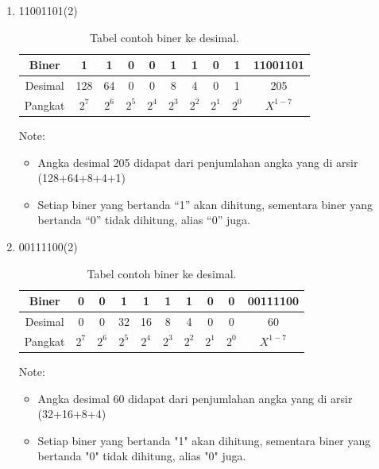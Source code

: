 \documentclass{article}
\begin{document}
\begin{enumerate}
\item 11001101(2) 

\begin{table}[h!]
\centering
\begin{tabular}{ |c|c|c|c|c|c|c|c|c|c| } 
\hline
Biner & 1 & 1 & 0 & 0 & 1 & 1 & 0 & 1 & 11001101 \\ 
\hline
Desimal & 128 & 64 & 0 & 0 & 8 & 4 & 0 & 1 & 205 \\ 
\hline
Pangkat & $2^7$ & $2^6$ & $2^5$ & $2^4$ & $2^3$ & $2^2$ & $2^1$ & $2^0$ & $X^{1-7}$ \\ 
\hline
\end{tabular}
\caption{Tabel contoh biner ke desimal.}
\label{table:contoh2}
\end{table}

Note:

\begin{itemize}
\item Angka desimal 205 didapat dari penjumlahan angka yang di arsir (128+64+8+4+1)
\item Setiap biner yang bertanda “1” akan dihitung, sementara biner yang bertanda “0” tidak dihitung, alias “0” juga.
\end{itemize}

\item 00111100(2) 

\begin{table}[h!]
\centering
\begin{tabular}{ |c|c|c|c|c|c|c|c|c|c| } 
\hline
Biner & 0 & 0 & 1 & 1 & 1 & 1 & 0 & 0 & 00111100 \\ 
\hline
Desimal & 0 & 0 & 32 & 16 & 8 & 4 & 0 & 0 & 60 \\ 
\hline
Pangkat & $2^7$ & $2^6$ & $2^5$ & $2^4$ & $2^3$ & $2^2$ & $2^1$ & $2^0$ & $X^{1-7}$ \\ 
\hline
\end{tabular}
\caption{Tabel contoh biner ke desimal.}
\label{table:contoh2}
\end{table}

Note:
\begin{itemize}
\item Angka desimal 60 didapat dari penjumlahan angka yang di arsir (32+16+8+4)
\item Setiap biner yang bertanda "1" akan dihitung, sementara biner yang bertanda "0" tidak dihitung, alias "0" juga.
\end{itemize}


\end{enumerate}
\end{document}
